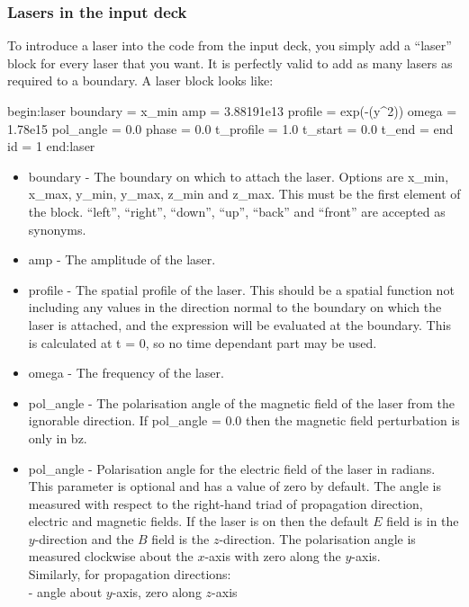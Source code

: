 \subsubsection{Lasers in the input deck}

To introduce a laser into the code from the input deck, you simply add a
``laser'' block for every laser that you want. It is perfectly valid to add as
many lasers as required to a boundary. A laser block looks like:
\begin{boxverbatim}
begin:laser
   boundary = x_min
   amp = 3.88191e13
   profile = exp(-(y^2))
   omega = 1.78e15
   pol_angle = 0.0
   phase = 0.0
   t_profile = 1.0
   t_start = 0.0
   t_end = end
   id = 1
end:laser
\end{boxverbatim}

\begin{itemize}
\item boundary - The boundary on which to attach the laser. Options are x\_min,
  x\_max, y\_min, y\_max, z\_min and z\_max. This must be the first element of
  the block. ``left'', ``right'', ``down'', ``up'', ``back'' and ``front'' are
  accepted as synonyms.
\item amp - The amplitude of the laser.
\item profile - The spatial profile of the laser. This should be a spatial
  function not including any values in the direction normal to the boundary
  on which the laser is attached, and the expression will be evaluated at the
  boundary. This is calculated at t = 0, so no time dependant part may be used.
\item omega - The frequency of the laser.
\item pol\_angle - The polarisation angle of the magnetic field of the laser
  from the ignorable direction. If pol\_angle = 0.0 then the magnetic field
  perturbation is only in bz.
\item pol\_angle - Polarisation angle for the electric field of the laser in
  radians. This parameter is optional and has a value of zero by default.
  The angle is measured with respect to the right-hand triad of propagation
  direction, electric and magnetic fields. If the laser is on
   then the default $E$ field is in the $y$-direction and
  the $B$ field is the $z$-direction. The polarisation angle is measured
  clockwise about the $x$-axis with zero along the $y$-axis.\\
  Similarly, for propagation directions:\\
 - angle about $y$-axis, zero along $z$-axis\\

\end{itemize}
